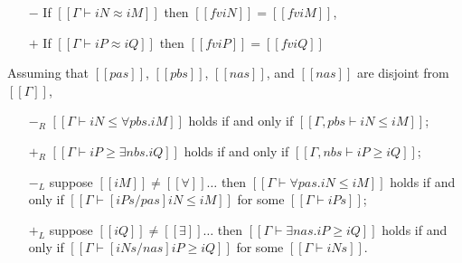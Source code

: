 \begin{corollary} \label{corollary:fv-mut-sub}
  \hfill
  \begin{itemize}
    \item [$-$] If $[[Γ ⊢ iN ≈ iM]]$ then $[[fv iN]] = [[fv iM]]$, 
    \item [$+$] If $[[Γ ⊢ iP ≈ iQ]]$ then $[[fv iP]] = [[fv iQ]]$
  \end{itemize}
\end{corollary}

\begin{lemma}
  \label{lemma:quant-rule-decomposition}
  Assuming that $[[pas]]$, $[[pbs]]$, $[[nas]]$, and $[[nas]]$ are disjoint from $[[Γ]]$,
  \begin{itemize}
    \item [$-_{R}$] $[[Γ ⊢ iN ≤ ∀pbs.iM]]$ holds if and only if $[[Γ, pbs ⊢ iN ≤ iM]]$;
    \item [$+_{R}$] $[[Γ ⊢ iP ≥ ∃nbs.iQ]]$ holds if and only if $[[Γ, nbs ⊢ iP ≥ iQ]]$;
    \item [$-_{L}$] suppose $[[iM]] \neq [[∀]]\dots$
      then $[[Γ ⊢ ∀pas.iN ≤ iM]]$ holds if and only if $[[Γ ⊢ [iPs/pas]iN ≤ iM]]$
      for some $[[Γ ⊢ iPs]]$;
    \item [$+_{L}$] suppose $[[iQ]] \neq [[∃]]\dots$
      then $[[Γ ⊢ ∃nas.iP ≥ iQ]]$ holds if and only if $[[Γ ⊢ [iNs/nas]iP ≥ iQ]]$
      for some $[[Γ ⊢ iNs]]$.
  \end{itemize}
\end{lemma}
